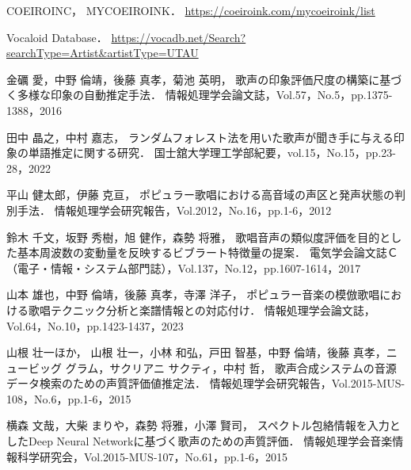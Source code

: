 \thispagestyle{myheadings}

\begin{thebibliography}{参考文献}

COEIROINC，
MYCOEIROINK．
\url{https://coeiroink.com/mycoeiroink/list}

Vocaloid Database．
\url{https://vocadb.net/Search?searchType=Artist&artistType=UTAU}




金礪 愛，中野 倫靖，後藤 真孝，菊池 英明，
歌声の印象評価尺度の構築に基づく多様な印象の自動推定手法．
情報処理学会論文誌，Vol.57，No.5，pp.1375-1388，2016

田中 晶之，中村 嘉志，
ランダムフォレスト法を用いた歌声が聞き手に与える印象の単語推定に関する研究．
国士舘大学理工学部紀要，vol.15，No.15，pp.23-28，2022

平山 健太郎，伊藤 克亘，
ポピュラー歌唱における高音域の声区と発声状態の判別手法．
情報処理学会研究報告，Vol.2012，No.16，pp.1-6，2012

鈴木 千文，坂野 秀樹，旭 健作，森勢 将雅，
歌唱音声の類似度評価を目的とした基本周波数の変動量を反映するビブラート特徴量の提案．
電気学会論文誌Ｃ（電子・情報・システム部門誌），Vol.137，No.12，pp.1607-1614，2017

山本 雄也，中野 倫靖，後藤 真孝，寺澤 洋子，
ポピュラー音楽の模倣歌唱における歌唱テクニック分析と楽譜情報との対応付け．
情報処理学会論文誌，Vol.64，No.10，pp.1423-1437，2023

山根 壮一ほか，
山根 壮一，小林 和弘，戸田 智基，中野 倫靖，後藤 真孝，ニュービッグ グラム，サクリアニ サクティ，中村 哲，
歌声合成システムの音源データ検索のための声質評価値推定法．
情報処理学会研究報告，Vol.2015-MUS-108，No.6，pp.1-6，2015

横森 文哉，大柴 まりや，森勢 将雅，小澤 賢司，
スペクトル包絡情報を入力としたDeep Neural Networkに基づく歌声のための声質評価．
情報処理学会音楽情報科学研究会，Vol.2015-MUS-107，No.61，pp.1-6，2015


\end{thebibliography}
